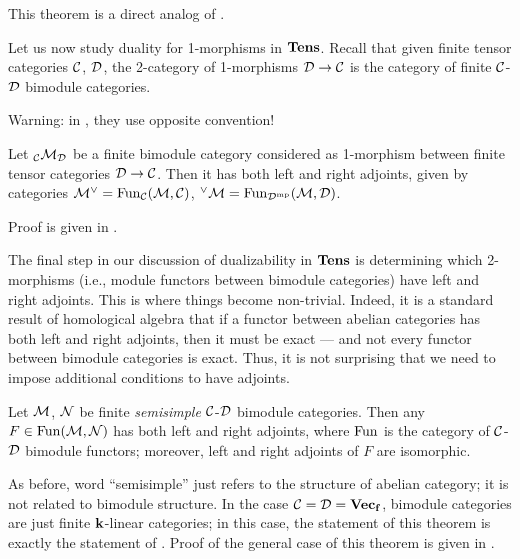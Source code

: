 This theorem is a direct analog of .

Let us now study duality for 1-morphisms in $\mathbf{Tens}$. Recall that given finite
tensor categories $\mathcal{C}$, $\mathcal{D}$, the 2-category of 1-morphisms
$\mathcal{D}\to\mathcal{C}$ is the category of finite $\mathcal{C}$-$\mathcal{D}$ bimodule categories.

Warning: in \cite{dsps-dualizable}, they use opposite convention!

\begin{theorem}\label{t:bimodule-dualizable}
  Let ${}_{\mathcal{C}}\mathcal{M}_{\mathcal{D}}$ be a finite bimodule category considered as
  1-morphism between finite tensor categories $\mathcal{D}\to\mathcal{C}$. Then it has both
  left and right adjoints, given by categories $\mathcal{M}^\vee=\operatorname{Fun}_{\mathcal{C}}(\mathcal{M},
  \mathcal{C})$, ${}^\vee\mathcal{M}=\operatorname{Fun}_{\mathcal{D}^{\mathrm{mp}}}(\mathcal{M}, \mathcal{D})$.
\end{theorem}

Proof is given in \cite[Proposition 3.2.1]{dsps-dualizable}.


The final step in our discussion of dualizability in $\mathbf{Tens}$ is determining
which 2-morphisms (i.e., module functors between bimodule categories) have left
and right adjoints. This is where things become non-trivial. Indeed, it is a
standard result of homological algebra that if a functor between abelian
categories has both left and right adjoints, then it must be exact --- and not
every functor between bimodule categories is exact. Thus, it is not surprising
that we need to impose additional conditions to have adjoints.

\begin{theorem}\label{t:tens-dual-2-morph}
  Let $\mathcal{M}$, $\mathcal{N}$ be finite \emph{semisimple} $\mathcal{C}$-$\mathcal{D}$ bimodule
  categories. Then any $F\in \operatorname{Fun} (\mathcal{M}, \mathcal{N})$ has both left and right
  adjoints, where $\operatorname{Fun}$ is the category of $\mathcal{C}$-$\mathcal{D}$ bimodule functors;
  moreover, left and right adjoints of $F$ are isomorphic.
\end{theorem}
As before, word ``semisimple'' just refers to the structure of abelian category;
it is not related to bimodule structure.
In the case $\mathcal{C}=\mathcal{D}=\mathbf{Vec_f}$, bimodule categories are just finite
$\mathbf{k}$-linear categories; in this case, the statement of this theorem is exactly
the statement of . Proof of the general case of this
theorem is given in  \cite[Proposition 3.4.1]{dsps-dualizable}.

